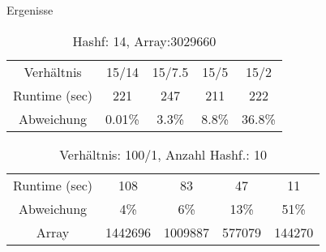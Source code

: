 \documentclass{beamer}
\begin{document}
\begin{frame}{Ergenisse }

 \begin{table}[h]
	\begin{tabular}{c|c|c|c|c}
		Verhältnis&15/14&15/7.5&15/5&15/2\\
		Runtime (sec)& 221&247&211&222\\
		Abweichung& 0.01\%& 3.3\%&8.8\%&36.8\%\\
			 		
	\end{tabular}
	\caption{Hashf: 14, Array:3029660 }
	\label{tab:meinetabelle1}
\end{table}
\begin{table}[h]
			 	
	\begin{tabular}{c|c|c|c|c}
		Runtime (sec)& 108&83&47&11\\
		Abweichung&4\%&6\%&13\%&51\%\\
		Array& 1442696&1009887&577079&144270\\
			 		
	\end{tabular}
	\caption{Verhältnis: 100/1, Anzahl Hashf.: 10 }
	\label{tab:meinetabelle2}
\end{table}
\end{frame}			 
\end{document}
